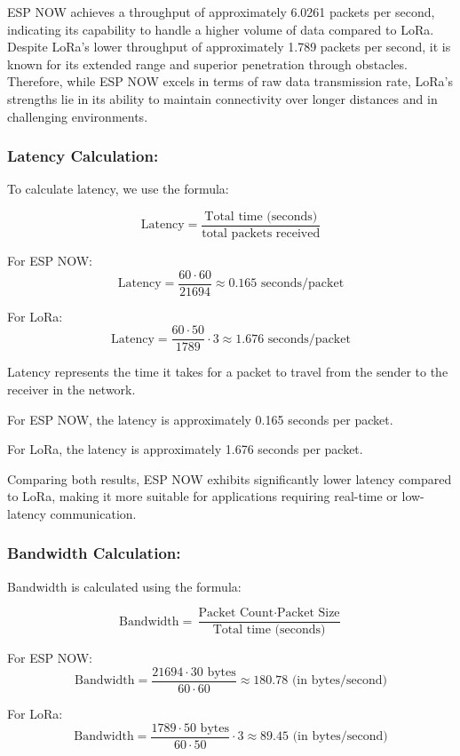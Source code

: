 ESP NOW achieves a throughput of approximately 6.0261 packets per second, indicating its capability to handle a higher volume of data compared to LoRa. Despite LoRa's lower throughput of approximately 1.789 packets per second, it is known for its extended range and superior penetration through obstacles. Therefore, while ESP NOW excels in terms of raw data transmission rate, LoRa's strengths lie in its ability to maintain connectivity over longer distances and in challenging environments.

\subsubsection{Latency Calculation:}

To calculate latency, we use the formula:

\[
\text{Latency} = \frac{\text{Total time (seconds)}}{\text{total packets received}}
\]

For ESP NOW:
\[
\text{Latency} = \frac{60 \cdot 60}{21694} \approx 0.165 \text{ seconds/packet}
\]

For LoRa:
\[
\text{Latency} = \frac{60 \cdot 50}{1789} \cdot 3 \approx 1.676 \text{ seconds/packet}
\]

Latency represents the time it takes for a packet to travel from the sender to the receiver in the network.

For ESP NOW, the latency is approximately 0.165 seconds per packet.

For LoRa, the latency is approximately 1.676 seconds per packet.

Comparing both results, ESP NOW exhibits significantly lower latency compared to LoRa, making it more suitable for applications requiring real-time or low-latency communication.

\subsubsection{Bandwidth Calculation:}

Bandwidth is calculated using the formula:

\[
\text{Bandwidth} = \frac{\text{Packet Count} \cdot \text{Packet Size}}{\text{Total time (seconds)}}
\]

For ESP NOW:
\[
\text{Bandwidth} = \frac{21694 \cdot 30 \text{ bytes}}{60 \cdot 60} \approx 180.78 \text{ (in bytes/second)}
\]

For LoRa:
\[
\text{Bandwidth} = \frac{1789 \cdot 50 \text{ bytes}}{60 \cdot 50} \cdot 3 \approx 89.45 \text{ (in bytes/second)}
\]

